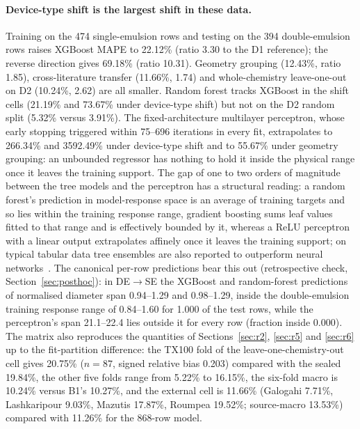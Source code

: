 \documentclass[11pt,a4paper]{article}
\newcommand{\tox}{TX100}
\begin{document}
\paragraph{Device-type shift is the largest shift in these data.} Training on the
474 single-emulsion rows and testing on the 394 double-emulsion rows raises
XGBoost MAPE to 22.12\% (ratio 3.30 to the D1 reference); the reverse
direction gives 69.18\% (ratio 10.31). Geometry grouping (12.43\%, ratio
1.85), cross-literature transfer (11.66\%, 1.74) and whole-chemistry
leave-one-out on D2 (10.24\%, 2.62) are all smaller. Random forest tracks
XGBoost in the shift cells (21.19\% and 73.67\% under device-type shift) but
not on the D2 random split (5.32\% versus 3.91\%). The
fixed-architecture multilayer perceptron, whose early stopping triggered
within 75--696 iterations in every fit, extrapolates to 266.34\% and
3592.49\% under device-type shift and to 55.67\% under geometry grouping: an
unbounded regressor has nothing to hold it inside the physical range once it
leaves the training support. The gap of one to two orders of magnitude between
the tree models and the perceptron has a structural reading: a random forest's
prediction in model-response space is an average of training targets and so
lies within the training response range, gradient boosting sums leaf values
fitted to that range and is effectively bounded by it, whereas a ReLU
perceptron with a linear output extrapolates affinely once it leaves the
training support; on typical tabular data tree ensembles are also
reported to outperform neural networks~\cite{grinsztajn2022}. The canonical per-row predictions bear this out
(retrospective check, Section~\ref{sec:posthoc}): in DE$\to$SE the XGBoost
and random-forest predictions of normalised diameter span 0.94--1.29 and
0.98--1.29, inside the double-emulsion training response range of 0.84--1.60
for 1.000 of the test rows, while the perceptron's span 21.1--22.4 lies
outside it for every row (fraction inside 0.000). The matrix also reproduces the quantities of
Sections~\ref{sec:r2}, \ref{sec:r5} and \ref{sec:r6} up to the fit-partition
difference: the \tox{} fold of the leave-one-chemistry-out cell gives 20.75\%
($n=87$, signed relative bias 0.203) compared with the sealed 19.84\%, the other
five folds range from 5.22\% to 16.15\%, the six-fold macro is 10.24\% versus B1's 10.27\%, and the external cell is 11.66\% (Galogahi 7.71\%,
Lashkaripour 9.03\%, Mazutis 17.87\%, Roumpea 19.52\%; source-macro
13.53\%) compared with 11.26\% for the 868-row model.
\end{document}
